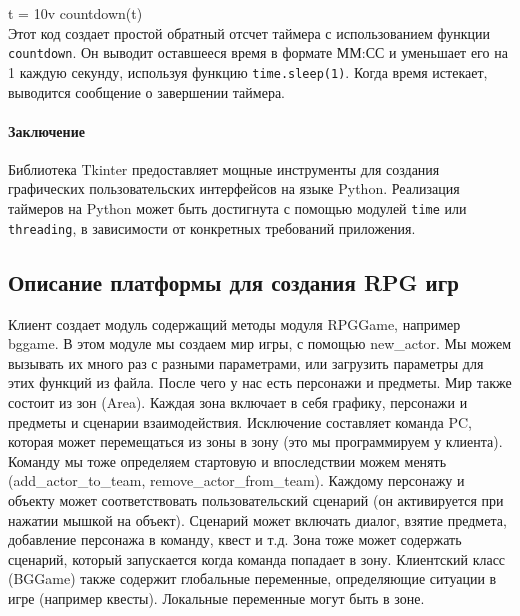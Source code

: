 	t = 10v
	countdown(t)\\
	
Этот код создает простой обратный отсчет таймера с использованием функции \texttt{countdown}. Он выводит оставшееся время в формате ММ:СС и уменьшает его на 1 каждую секунду, используя функцию \texttt{time.sleep(1)}. Когда время истекает, выводится сообщение о завершении таймера.
	
\paragraph{Заключение}
Библиотека Tkinter предоставляет мощные инструменты для создания графических пользовательских интерфейсов на языке Python. Реализация таймеров на Python может быть достигнута с помощью модулей \texttt{time} или \texttt{threading}, в зависимости от конкретных требований приложения.

\subsection{Описание платформы для создания RPG игр}
Клиент создает модуль содержащий методы модуля RPGGame, например bggame. В этом модуле мы создаем мир игры, с помощью new\_actor. Мы можем вызывать их много раз с разными параметрами, или загрузить параметры для этих функций из файла. После чего у нас есть персонажи и предметы. Мир также состоит из зон (Area). Каждая зона включает в себя графику, персонажи и предметы и сценарии взаимодействия. Исключение составляет команда PC, которая может перемещаться из зоны в зону (это мы программируем у клиента). Команду мы тоже определяем стартовую и впоследствии можем менять (add\_actor\_to\_team, remove\_actor\_from\_team). Каждому персонажу и объекту может соответствовать пользовательский сценарий (он активируется при нажатии мышкой на объект). Сценарий может включать диалог, взятие предмета, добавление персонажа в команду, квест и т.д.
Зона тоже может содержать сценарий, который запускается когда команда попадает в зону.
Клиентский класс (BGGame) также содержит глобальные переменные, определяющие ситуации в игре (например квесты). Локальные переменные могут быть в зоне.

